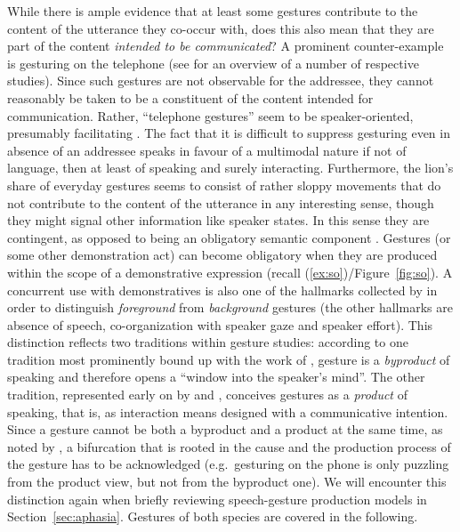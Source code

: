 \documentclass[output=paper
                ,modfonts
                ,nonflat
	        ,collection
	        ,collectionchapter
	        ,collectiontoclongg
 	        ,biblatex
                ,babelshorthands
                ,newtxmath
                ,draftmode
                ,colorlinks, citecolor=brown
]{./langsci/langscibook}
\begin{document}
While there is ample evidence that at least some gestures contribute to the content of the utterance they co-occur with, does this also mean that they are part of the content \emph{intended to be communicated}?
%
A prominent counter-example is gesturing on the telephone (see \citealt{Bavelas:Gerwing:Sutton:Prevost:2008} for an overview of a number of respective studies).
%
Since such gestures are not observable for the addressee, they cannot reasonably be taken to be a constituent of the content intended for communication.
%
Rather, \enquote{telephone gestures} seem to be speaker-oriented, presumably facilitating .
%
The fact that it is difficult to suppress gesturing even in absence of an addressee speaks in favour of a multimodal nature if not of language, then at least of speaking and surely interacting.
%
Furthermore, the lion's share of everyday gestures seems to consist of rather sloppy movements that do not contribute to the content of the utterance in any interesting sense, though they might signal other information like speaker states.
%
In this sense they are contingent, as opposed to being an obligatory  semantic component \citep{Luecking:2013:a}.
%
Gestures (or some other demonstration act) can become obligatory when they are produced within the scope of a demonstrative expression (recall (\ref{ex:so})/Figure~\ref{fig:so}).
%
A concurrent use with demonstratives is also one of the hallmarks collected by \citet{Cooperrider:2017} in order to distinguish \emph{foreground}  from \emph{background}  gestures (the other hallmarks are absence of speech, co-organization with speaker gaze and speaker effort).
%
This distinction reflects two traditions within gesture studies: according to one tradition most prominently bound up with the work of \citet{McNeill:1992}, gesture is a \emph{byproduct}  of speaking and therefore opens a \enquote{window into the speaker's mind}.
%
The other tradition, represented early on by \citet{Goodwin:2003} and \citet{Clark:1996}, conceives gestures as a \emph{product}  of speaking, that is, as interaction means designed with a communicative intention.
%
Since a gesture cannot be both a byproduct and a product at the same time, as noted by \citet{Cooperrider:2017}, a bifurcation that is rooted in the cause and the production process of the gesture has to be acknowledged (e.g.\ gesturing on the phone is only puzzling from the product view, but not from the byproduct one). 
%
We will encounter this distinction again when briefly reviewing speech-gesture production models in Section~\ref{sec:aphasia}.
%
Gestures of both species are covered in the following.
\end{document}
